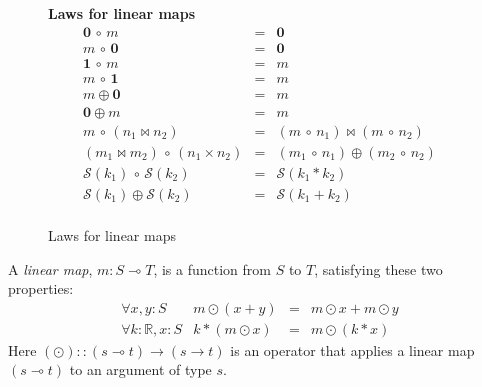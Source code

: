 \documentclass[sigplan,review]{acmart}
\renewcommand{\to}{\rightarrow}    %
\newcommand{\linto}{\multimap}     %
\newcommand{\typ}[2]{#1 \! : \! #2}  %
\newcommand{\real}{\mathbb{R}}       %
\newcommand{\lmapply}{\odot}   %
\newcommand{\lmcomp}{\,\circ\,}   %
\newcommand{\lmtrans}[1]{#1^{\top}}   %
\newcommand{\lmpair}{\times}         %
\newcommand{\lmjoin}{\bowtie}        %
\newcommand{\lmadd}{\oplus}        %
\newcommand{\lmzero}{\mathbf{0}}     %
\newcommand{\lmone}{\mathbf{1}}      %
\newcommand{\lmscalar}[1]{{\mathcal S}(#1)}      %
\newcommand{\lmlam}[1]{{\mathcal L}(#1)}      %
\newcommand{\lmlamt}[1]{{\mathcal M}(#1)}     %
\begin{document}
\begin{figure}
{\begin{minipage}{\columnwidth}
$$\begin{array}{rcll}
  \end{array}
  $$
\\[3mm]
  {\bf Laws for linear maps}
  $$
  \begin{array}{rcl}
    \lmzero \lmcomp m & = & \lmzero \\
    m \lmcomp \lmzero & = & \lmzero \\
    \lmone \lmcomp m & = & m \\
    m \lmcomp \lmone & = & m \\
    m \lmadd \lmzero & = & m \\
    \lmzero \lmadd m & = & m \\
    m \lmcomp (n_1 \lmjoin n_2) & = & (m \lmcomp n_1) \lmjoin (m \lmcomp n_2) \\
    (m_1 \lmjoin m_2) \lmcomp (n_1 \lmpair n_2) & = & (m_1 \lmcomp n_1) \lmadd (m_2 \lmcomp n_2) \\
    \lmscalar{k_1} \lmcomp \lmscalar{k_2} & = & \lmscalar{ k_1 * k_2 } \\
    \lmscalar{k_1} \lmadd \lmscalar{k_2} & = & \lmscalar{ k_1 + k_2 } \\
  \end{array}
  $$
    \end{minipage}
    }
    \caption{Laws for linear maps} \label{fig:lm-laws}
\end{figure}

A \emph{linear map}, $m : S \linto T$, is a function from $S$ to $T$,
satisfying these two properties:
$$
\begin{array}{rrcl}
  \forall \typ{x,y}{S} &  m \lmapply (x+y) & = & m \lmapply x + m \lmapply y \\
  \forall \typ{k}{\real}, \typ{x}{S} & k * (m \lmapply x) & = & m \lmapply (k * x)
\end{array}
$$
Here $(\lmapply) :: (s \linto t) \to (s \to t)$ is an operator that applies a linear map $(s \linto t)$
to an argument of type $s$.
\end{document}
